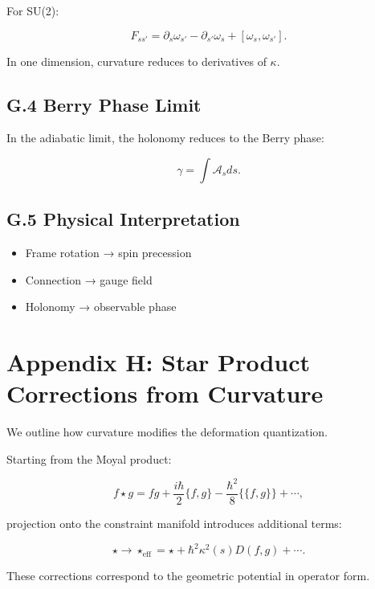 \documentclass[11pt]{article}
\begin{document}
For SU(2):

\[
F_{ss'} = \partial_s \omega_{s'} - \partial_{s'} \omega_s + [\omega_s,\omega_{s'}].
\]

In one dimension, curvature reduces to derivatives of $\kappa$.

\subsection*{G.4 Berry Phase Limit}

In the adiabatic limit, the holonomy reduces to the Berry phase:

\[
\gamma = \int \mathcal{A}_s ds.
\]

\subsection*{G.5 Physical Interpretation}

\begin{itemize}
\item Frame rotation → spin precession
\item Connection → gauge field
\item Holonomy → observable phase
\end{itemize}

\section*{Appendix H: Star Product Corrections from Curvature}

We outline how curvature modifies the deformation quantization.

Starting from the Moyal product:

\[
f \star g =
f g + \frac{i\hbar}{2}\{f,g\}
- \frac{\hbar^2}{8}\{\!\{f,g\}\!\} + \cdots,
\]

projection onto the constraint manifold introduces additional terms:

\[
\star \to \star_{\mathrm{eff}} =
\star + \hbar^2 \kappa^2(s) D(f,g) + \cdots.
\]

These corrections correspond to the geometric potential in operator form.
\end{document}

